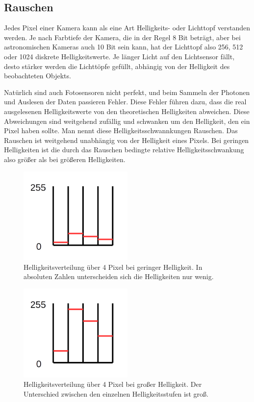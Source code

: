 \documentclass[10pt,a4paper,titlepage]{article}
\begin{document}
\subsection{Rauschen}
Jedes Pixel einer Kamera kann als eine Art Helligkeits- oder Lichttopf verstanden werden. Je nach Farbtiefe der Kamera, die in der Regel 8 Bit beträgt, aber bei astronomischen Kameras auch 10 Bit sein kann, hat der Lichttopf also 256, 512 oder 1024 diskrete Helligkeitswerte. Je länger Licht auf den Lichtsensor fällt, desto stärker werden die Lichttöpfe gefüllt, abhängig von der Helligkeit des beobachteten Objekts.

Natürlich sind auch Fotosensoren nicht perfekt, und beim Sammeln der Photonen und Auslesen der Daten passieren Fehler. Diese Fehler führen dazu, dass die real ausgelesenen Helligkeitswerte von den theoretischen Helligkeiten abweichen. Diese Abweichungen sind weitgehend zufällig und schwanken um den Helligkeit, den ein Pixel haben sollte. Man nennt diese Helligkeitsschwannkungen Rauschen. Das Rauschen ist weitgehend unabhängig von der Helligkeit eines Pixels. Bei geringen Helligkeiten ist die durch das Rauschen bedingte relative Helligkeitsschwankung also größer als bei größeren Helligkeiten.

\begin{figure}[h!]
  \centering
    \includegraphics[width=0.5\textwidth]{CCD_geringe_Helligkeit}
  \caption{Helligkeitsverteilung über 4 Pixel bei geringer Helligkeit. In absoluten Zahlen unterscheiden sich die Helligkeiten nur wenig.}
  \label{fig:ccd-dunkel}
\end{figure}

\begin{figure}[h!]
  \centering
    \includegraphics[width=0.5\textwidth]{CCD_ideale_Helligkeit}
  \caption{Helligkeitsverteilung über 4 Pixel bei großer Helligkeit. Der Unterschied zwischen den einzelnen Helligkeitsstufen ist groß.}
  \label{fig:ccd-hell}
\end{figure}
\end{document}
